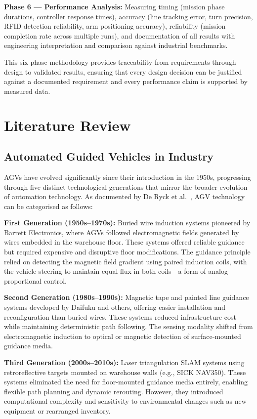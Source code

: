 \documentclass[12pt,a4paper,oneside]{report}
\begin{document}
\textbf{Phase 6 --- Performance Analysis:} Measuring timing (mission phase durations, controller response times), accuracy (line tracking error, turn precision, RFID detection reliability, arm positioning accuracy), reliability (mission completion rate across multiple runs), and documentation of all results with engineering interpretation and comparison against industrial benchmarks.

This six-phase methodology provides traceability from requirements through design to validated results, ensuring that every design decision can be justified against a documented requirement and every performance claim is supported by measured data.

\section{Literature Review}

\subsection{Automated Guided Vehicles in Industry}

AGVs have evolved significantly since their introduction in the 1950s, progressing through five distinct technological generations that mirror the broader evolution of automation technology. As documented by De Ryck et al.~\cite{deryck2020}, AGV technology can be categorised as follows:

\textbf{First Generation (1950s--1970s):} Buried wire induction systems pioneered by Barrett Electronics, where AGVs followed electromagnetic fields generated by wires embedded in the warehouse floor. These systems offered reliable guidance but required expensive and disruptive floor modifications. The guidance principle relied on detecting the magnetic field gradient using paired induction coils, with the vehicle steering to maintain equal flux in both coils---a form of analog proportional control.

\textbf{Second Generation (1980s--1990s):} Magnetic tape and painted line guidance systems developed by Daifuku and others, offering easier installation and reconfiguration than buried wires. These systems reduced infrastructure cost while maintaining deterministic path following. The sensing modality shifted from electromagnetic induction to optical or magnetic detection of surface-mounted guidance media.

\textbf{Third Generation (2000s--2010s):} Laser triangulation SLAM systems using retroreflective targets mounted on warehouse walls (e.g., SICK NAV350). These systems eliminated the need for floor-mounted guidance media entirely, enabling flexible path planning and dynamic rerouting. However, they introduced computational complexity and sensitivity to environmental changes such as new equipment or rearranged inventory.
\end{document}
